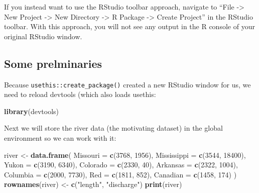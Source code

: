 \documentclass[
]{book}
\newenvironment{Shaded}{\begin{snugshade}}{\end{snugshade}}
\newcommand{\DataTypeTok}[1]{\textcolor[rgb]{0.13,0.29,0.53}{#1}}
\newcommand{\DecValTok}[1]{\textcolor[rgb]{0.00,0.00,0.81}{#1}}
\newcommand{\KeywordTok}[1]{\textcolor[rgb]{0.13,0.29,0.53}{\textbf{#1}}}
\newcommand{\NormalTok}[1]{#1}
\newcommand{\StringTok}[1]{\textcolor[rgb]{0.31,0.60,0.02}{#1}}
\begin{document}
If you instead want to use the RStudio toolbar approach, navigate to ``File -\textgreater{} New Project -\textgreater{} New Directory -\textgreater{} R Package -\textgreater{} Create Project'' in the RStudio toolbar. With this approach, you will not see any output in the R console of your original RStudio window.

\hypertarget{some-prelminaries}{%
\subsection{Some prelminaries}\label{some-prelminaries}}

Because \texttt{usethis::create\_package()} created a new RStudio window for us, we need to reload devtools (which also loads usethis:

\begin{Shaded}
\begin{Highlighting}[]
\KeywordTok{library}\NormalTok{(devtools)}
\end{Highlighting}
\end{Shaded}

Next we will store the river data (the motivating dataset) in the global environment so we can work with it:

\begin{Shaded}
\begin{Highlighting}[]
\NormalTok{river <-}\StringTok{ }\KeywordTok{data.frame}\NormalTok{(}
  \DataTypeTok{Missouri =} \KeywordTok{c}\NormalTok{(}\DecValTok{3768}\NormalTok{, }\DecValTok{1956}\NormalTok{),}
  \DataTypeTok{Mississippi =} \KeywordTok{c}\NormalTok{(}\DecValTok{3544}\NormalTok{, }\DecValTok{18400}\NormalTok{),}
  \DataTypeTok{Yukon =} \KeywordTok{c}\NormalTok{(}\DecValTok{3190}\NormalTok{, }\DecValTok{6340}\NormalTok{),}
  \DataTypeTok{Colorado =} \KeywordTok{c}\NormalTok{(}\DecValTok{2330}\NormalTok{, }\DecValTok{40}\NormalTok{),}
  \DataTypeTok{Arkansas =} \KeywordTok{c}\NormalTok{(}\DecValTok{2322}\NormalTok{, }\DecValTok{1004}\NormalTok{),}
  \DataTypeTok{Columbia =} \KeywordTok{c}\NormalTok{(}\DecValTok{2000}\NormalTok{, }\DecValTok{7730}\NormalTok{),}
  \DataTypeTok{Red =} \KeywordTok{c}\NormalTok{(}\DecValTok{1811}\NormalTok{, }\DecValTok{852}\NormalTok{),}
  \DataTypeTok{Canadian =} \KeywordTok{c}\NormalTok{(}\DecValTok{1458}\NormalTok{, }\DecValTok{174}\NormalTok{)}
\NormalTok{) }
\KeywordTok{rownames}\NormalTok{(river) <-}\StringTok{ }\KeywordTok{c}\NormalTok{(}\StringTok{"length"}\NormalTok{, }\StringTok{"discharge"}\NormalTok{)}
\KeywordTok{print}\NormalTok{(river)}
\end{Highlighting}
\end{Shaded}
\end{document}
